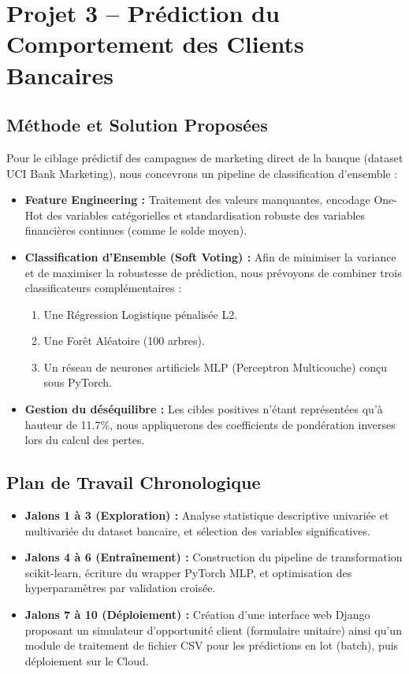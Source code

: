 \documentclass[12pt,a4paper]{article}
\begin{document}
\newpage

\section{Projet 3 -- Prédiction du Comportement des Clients Bancaires}

\subsection{Méthode et Solution Proposées}
Pour le ciblage prédictif des campagnes de marketing direct de la banque (dataset UCI Bank Marketing), nous concevrons un pipeline de classification d'ensemble :
\begin{itemize}
    \item \textbf{Feature Engineering :} Traitement des valeurs manquantes, encodage One-Hot des variables catégorielles et standardisation robuste des variables financières continues (comme le solde moyen).
    \item \textbf{Classification d'Ensemble (Soft Voting) :} Afin de minimiser la variance et de maximiser la robustesse de prédiction, nous prévoyons de combiner trois classificateurs complémentaires :
    \begin{enumerate}
        \item Une Régression Logistique pénalisée L2.
        \item Une Forêt Aléatoire (100 arbres).
        \item Un réseau de neurones artificiels MLP (Perceptron Multicouche) conçu sous PyTorch.
    \end{enumerate}
    \item \textbf{Gestion du déséquilibre :} Les cibles positives n'étant représentées qu'à hauteur de 11.7\%, nous appliquerons des coefficients de pondération inverses lors du calcul des pertes.
\end{itemize}

\subsection{Plan de Travail Chronologique}
\begin{itemize}
    \item \textbf{Jalons 1 à 3 (Exploration) :} Analyse statistique descriptive univariée et multivariée du dataset bancaire, et sélection des variables significatives.
    \item \textbf{Jalons 4 à 6 (Entraînement) :} Construction du pipeline de transformation scikit-learn, écriture du wrapper PyTorch MLP, et optimisation des hyperparamètres par validation croisée.
    \item \textbf{Jalons 7 à 10 (Déploiement) :} Création d'une interface web Django proposant un simulateur d'opportunité client (formulaire unitaire) ainsi qu'un module de traitement de fichier CSV pour les prédictions en lot (batch), puis déploiement sur le Cloud.
\end{itemize}
\end{document}
